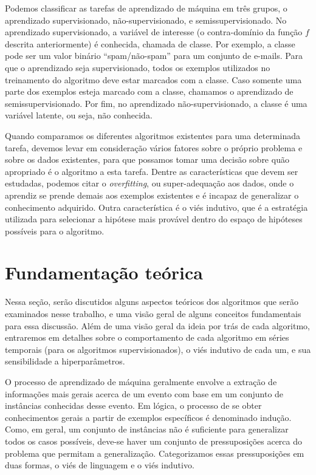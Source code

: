 \documentclass{article}
\begin{document}
Podemos classificar as tarefas de aprendizado de máquina em três grupos,
o aprendizado supervisionado, não-supervisionado, e semissupervisionado.
No aprendizado supervisionado, a variável de interesse (o contra-domínio da função $f$ descrita anteriormente)
é conhecida, chamada de classe. Por exemplo, a classe pode ser um valor binário ``spam/não-spam''
para um conjunto de e-mails. Para que o aprendizado seja supervisionado, todos os exemplos utilizados
no treinamento do algoritmo deve estar marcados com a classe.
Caso somente uma parte dos exemplos esteja marcado com a classe, chamamos o aprendizado de semissupervisionado.
Por fim, no aprendizado não-supervisionado, a classe é uma variável latente, ou seja, não conhecida.

Quando comparamos os diferentes algoritmos existentes para uma determinada tarefa,
devemos levar em consideração vários fatores sobre o próprio problema e sobre os dados existentes,
para que possamos tomar uma decisão sobre quão apropriado é o algoritmo a esta tarefa.
Dentre as características que devem ser estudadas,
podemos citar o {\it overfitting}, ou super-adequação aos dados,
onde o aprendiz se prende demais aos exemplos existentes e é incapaz de generalizar o conhecimento adquirido.
Outra característica é o viés indutivo, que é a estratégia utilizada para selecionar a
hipótese mais provável dentro do espaço de hipóteses possíveis para o algoritmo.

\section{Fundamentação teórica}

Nessa seção, serão discutidos alguns aspectos teóricos dos algoritmos que serão examinados nesse trabalho,
e uma visão geral de alguns conceitos fundamentais para essa discussão.
Além de uma visão geral da ideia por trás de cada algoritmo,
entraremos em detalhes sobre o comportamento de cada algoritmo em séries temporais (para os algoritmos supervisionados),
o viés indutivo de cada um, e sua sensibilidade a hiperparâmetros.

O processo de aprendizado de máquina geralmente envolve a extração de informações mais gerais acerca de um evento com base em um conjunto de instâncias conhecidas desse evento.
Em lógica, o processo de se obter conhecimentos gerais a partir de exemplos específicos é denominado indução.
Como, em geral, um conjunto de instâncias não é suficiente para generalizar todos os casos possíveis,
deve-se haver um conjunto de pressuposições acerca do problema que permitam a generalização.
Categorizamos essas pressuposições em duas formas, o viés de linguagem e o viés indutivo.
\end{document}
